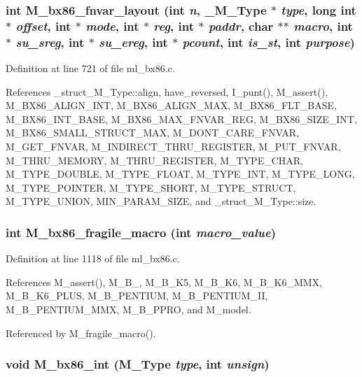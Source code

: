 \subsubsection{\setlength{\rightskip}{0pt plus 5cm}int M\_\-bx86\_\-fnvar\_\-layout (int {\em n}, \bf{\_\-M\_\-Type} $\ast$ {\em type}, long int $\ast$ {\em offset}, int $\ast$ {\em mode}, int $\ast$ {\em reg}, int $\ast$ {\em paddr}, char $\ast$$\ast$ {\em macro}, int $\ast$ {\em su\_\-sreg}, int $\ast$ {\em su\_\-ereg}, int $\ast$ {\em pcount}, int {\em is\_\-st}, int {\em purpose})}\label{m__bx86_8h_ec6b6d6e2f94ff9c63ee392829f32504}




Definition at line 721 of file ml\_\-bx86.c.

References \_\-struct\_\-M\_\-Type::align, have\_\-reversed, I\_\-punt(), M\_\-assert(), M\_\-BX86\_\-ALIGN\_\-INT, M\_\-BX86\_\-ALIGN\_\-MAX, M\_\-BX86\_\-FLT\_\-BASE, M\_\-BX86\_\-INT\_\-BASE, M\_\-BX86\_\-MAX\_\-FNVAR\_\-REG, M\_\-BX86\_\-SIZE\_\-INT, M\_\-BX86\_\-SMALL\_\-STRUCT\_\-MAX, M\_\-DONT\_\-CARE\_\-FNVAR, M\_\-GET\_\-FNVAR, M\_\-INDIRECT\_\-THRU\_\-REGISTER, M\_\-PUT\_\-FNVAR, M\_\-THRU\_\-MEMORY, M\_\-THRU\_\-REGISTER, M\_\-TYPE\_\-CHAR, M\_\-TYPE\_\-DOUBLE, M\_\-TYPE\_\-FLOAT, M\_\-TYPE\_\-INT, M\_\-TYPE\_\-LONG, M\_\-TYPE\_\-POINTER, M\_\-TYPE\_\-SHORT, M\_\-TYPE\_\-STRUCT, M\_\-TYPE\_\-UNION, MIN\_\-PARAM\_\-SIZE, and \_\-struct\_\-M\_\-Type::size.
\subsubsection{\setlength{\rightskip}{0pt plus 5cm}int M\_\-bx86\_\-fragile\_\-macro (int {\em macro\_\-value})}\label{m__bx86_8h_e9dad53ec18df549a23857a02956788c}




Definition at line 1118 of file ml\_\-bx86.c.

References M\_\-assert(), M\_\-B\_, M\_\-B\_\-K5, M\_\-B\_\-K6, M\_\-B\_\-K6\_\-MMX, M\_\-B\_\-K6\_\-PLUS, M\_\-B\_\-PENTIUM, M\_\-B\_\-PENTIUM\_\-II, M\_\-B\_\-PENTIUM\_\-MMX, M\_\-B\_\-PPRO, and M\_\-model.

Referenced by M\_\-fragile\_\-macro().
\subsubsection{\setlength{\rightskip}{0pt plus 5cm}void M\_\-bx86\_\-int (\bf{M\_\-Type} {\em type}, int {\em unsign})}\label{m__bx86_8h_bd6ada44fbc29003453b256cfb8df230}





